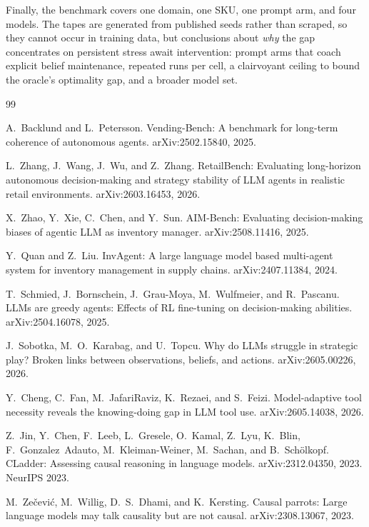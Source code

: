 \documentclass{article}
\begin{document}
Finally, the benchmark covers one domain, one SKU, one prompt arm, and
four models. The tapes are generated from published seeds rather than
scraped, so they cannot occur in training data, but conclusions about
\emph{why} the gap concentrates on persistent stress await intervention:
prompt arms that coach explicit belief maintenance, repeated runs per cell,
a clairvoyant ceiling to bound the oracle's optimality gap, and a broader
model set.

\begin{thebibliography}{99}
\small

A.~Backlund and L.~Petersson.
Vending-Bench: A benchmark for long-term coherence of autonomous agents.
arXiv:2502.15840, 2025.

L.~Zhang, J.~Wang, J.~Wu, and Z.~Zhang.
RetailBench: Evaluating long-horizon autonomous decision-making and strategy
stability of LLM agents in realistic retail environments.
arXiv:2603.16453, 2026.

X.~Zhao, Y.~Xie, C.~Chen, and Y.~Sun.
AIM-Bench: Evaluating decision-making biases of agentic LLM as inventory
manager.
arXiv:2508.11416, 2025.

Y.~Quan and Z.~Liu.
InvAgent: A large language model based multi-agent system for inventory
management in supply chains.
arXiv:2407.11384, 2024.

T.~Schmied, J.~Bornschein, J.~Grau-Moya, M.~Wulfmeier, and R.~Pascanu.
LLMs are greedy agents: Effects of RL fine-tuning on decision-making
abilities.
arXiv:2504.16078, 2025.

J.~Sobotka, M.~O.~Karabag, and U.~Topcu.
Why do LLMs struggle in strategic play? Broken links between observations,
beliefs, and actions.
arXiv:2605.00226, 2026.

Y.~Cheng, C.~Fan, M.~JafariRaviz, K.~Rezaei, and S.~Feizi.
Model-adaptive tool necessity reveals the knowing-doing gap in LLM tool
use.
arXiv:2605.14038, 2026.

Z.~Jin, Y.~Chen, F.~Leeb, L.~Gresele, O.~Kamal, Z.~Lyu, K.~Blin,
F.~Gonzalez~Adauto, M.~Kleiman-Weiner, M.~Sachan, and B.~Sch\"olkopf.
CLadder: Assessing causal reasoning in language models.
arXiv:2312.04350, 2023. NeurIPS 2023.

M.~Ze\v{c}evi\'c, M.~Willig, D.~S.~Dhami, and K.~Kersting.
Causal parrots: Large language models may talk causality but are not
causal.
arXiv:2308.13067, 2023.


\end{thebibliography}
\end{document}
